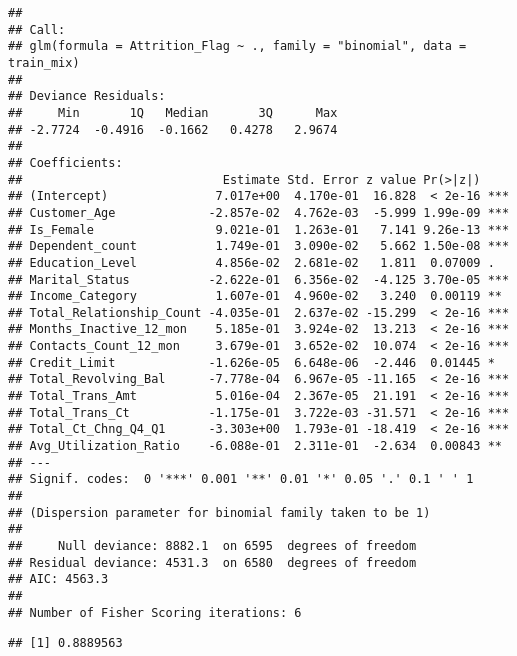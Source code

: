 \documentclass[
]{article}
\newenvironment{Shaded}{\begin{snugshade}}{\end{snugshade}}
\newcommand{\DecValTok}[1]{\textcolor[rgb]{0.00,0.00,0.81}{#1}}
\newcommand{\FloatTok}[1]{\textcolor[rgb]{0.00,0.00,0.81}{#1}}
\newcommand{\FunctionTok}[1]{\textcolor[rgb]{0.00,0.00,0.00}{#1}}
\newcommand{\NormalTok}[1]{#1}
\newcommand{\OtherTok}[1]{\textcolor[rgb]{0.56,0.35,0.01}{#1}}
\newcommand{\SpecialCharTok}[1]{\textcolor[rgb]{0.00,0.00,0.00}{#1}}
\begin{document}
\begin{verbatim}
## 
## Call:
## glm(formula = Attrition_Flag ~ ., family = "binomial", data = train_mix)
## 
## Deviance Residuals: 
##     Min       1Q   Median       3Q      Max  
## -2.7724  -0.4916  -0.1662   0.4278   2.9674  
## 
## Coefficients:
##                            Estimate Std. Error z value Pr(>|z|)    
## (Intercept)               7.017e+00  4.170e-01  16.828  < 2e-16 ***
## Customer_Age             -2.857e-02  4.762e-03  -5.999 1.99e-09 ***
## Is_Female                 9.021e-01  1.263e-01   7.141 9.26e-13 ***
## Dependent_count           1.749e-01  3.090e-02   5.662 1.50e-08 ***
## Education_Level           4.856e-02  2.681e-02   1.811  0.07009 .  
## Marital_Status           -2.622e-01  6.356e-02  -4.125 3.70e-05 ***
## Income_Category           1.607e-01  4.960e-02   3.240  0.00119 ** 
## Total_Relationship_Count -4.035e-01  2.637e-02 -15.299  < 2e-16 ***
## Months_Inactive_12_mon    5.185e-01  3.924e-02  13.213  < 2e-16 ***
## Contacts_Count_12_mon     3.679e-01  3.652e-02  10.074  < 2e-16 ***
## Credit_Limit             -1.626e-05  6.648e-06  -2.446  0.01445 *  
## Total_Revolving_Bal      -7.778e-04  6.967e-05 -11.165  < 2e-16 ***
## Total_Trans_Amt           5.016e-04  2.367e-05  21.191  < 2e-16 ***
## Total_Trans_Ct           -1.175e-01  3.722e-03 -31.571  < 2e-16 ***
## Total_Ct_Chng_Q4_Q1      -3.303e+00  1.793e-01 -18.419  < 2e-16 ***
## Avg_Utilization_Ratio    -6.088e-01  2.311e-01  -2.634  0.00843 ** 
## ---
## Signif. codes:  0 '***' 0.001 '**' 0.01 '*' 0.05 '.' 0.1 ' ' 1
## 
## (Dispersion parameter for binomial family taken to be 1)
## 
##     Null deviance: 8882.1  on 6595  degrees of freedom
## Residual deviance: 4531.3  on 6580  degrees of freedom
## AIC: 4563.3
## 
## Number of Fisher Scoring iterations: 6
\end{verbatim}

\begin{Shaded}
\end{Shaded}

\begin{verbatim}
## [1] 0.8889563
\end{verbatim}
\end{document}

